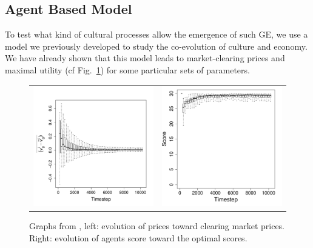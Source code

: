 \documentclass[a1paper,fontscale=.49]{baposter}
\begin{document}
\begin{poster}
{\subsection*{Agent Based Model}
To test what kind of cultural processes allow the emergence of such GE, we use a model we previously developed to study the co-evolution of culture and economy. We have already shown that this model leads to market-clearing prices and maximal utility (cf Fig.~\ref{fig:ratioEvol}) for some particular sets of parameters. 
	\vspace{-.75cm}
\begin{figure}[H]
	\begin{tabular}{cc}
		\includegraphics[width=.5\textwidth]{img/ClearingPriceDistanceEvolutionForTrade-G3N500.pdf}&
		\includegraphics[width=.45\textwidth]{img/ScoreEvolutionForTrade-G3N500.pdf} \\
	\end{tabular}
	\vspace{-.5cm}
	\caption{
	    \small
	    Graphs from \cite{carrignon2015modelingthecoevolutionoftradeandcultureinpastsocieties}, left: evolution of prices toward clearing market prices. Right: evolution of agents score toward the optimal scores.
	}
	\label{fig:ratioEvol}
\end{figure}

}
\end{poster}
\end{document}
